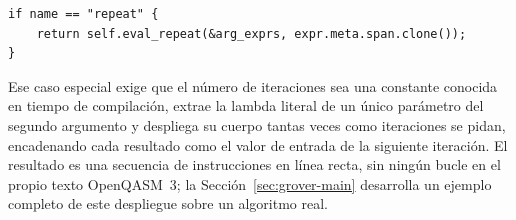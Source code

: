 \begin{lstlisting}[language={}, caption=Intercepción de repeat antes de la evaluación genérica de argumentos]
if name == "repeat" {
    return self.eval_repeat(&arg_exprs, expr.meta.span.clone());
}
\end{lstlisting}

Ese caso especial exige que el número de iteraciones sea una constante conocida en tiempo de compilación, extrae la lambda literal de un único parámetro del segundo argumento y despliega su cuerpo tantas veces como iteraciones se pidan, encadenando cada resultado como el valor de entrada de la siguiente iteración. El resultado es una secuencia de instrucciones en línea recta, sin ningún bucle en el propio texto OpenQASM~3; la Sección~\ref{sec:grover-main} desarrolla un ejemplo completo de este despliegue sobre un algoritmo real.
